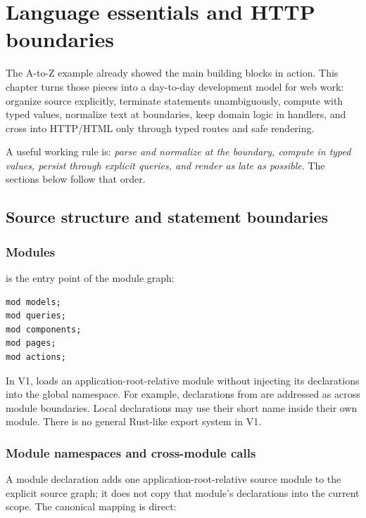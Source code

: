 \chapter{Language essentials and HTTP boundaries}

The A-to-Z example already showed the main building blocks in action. This chapter turns those pieces into a day-to-day development model for web work: organize source explicitly, terminate statements unambiguously, compute with typed values, normalize text at boundaries, keep domain logic in handlers, and cross into HTTP/HTML only through typed routes and safe rendering.

A useful working rule is: \emph{parse and normalize at the boundary, compute in typed values, persist through explicit queries, and render as late as possible}. The sections below follow that order.

\section{Source structure and statement boundaries}

\subsection*{Modules}

 is the entry point of the module graph:

\begin{lstlisting}[language=RWLang]
mod models;
mod queries;
mod components;
mod pages;
mod actions;
\end{lstlisting}

In V1,  loads an application-root-relative module without injecting its declarations into the global namespace. For example, declarations from  are addressed as  across module boundaries. Local declarations may use their short name inside their own module. There is no general Rust-like  export system in V1.

\subsection*{Module namespaces and cross-module calls}

A module declaration adds one application-root-relative source module to the explicit source graph; it does not copy that module's declarations into the current scope. The canonical mapping is direct:

